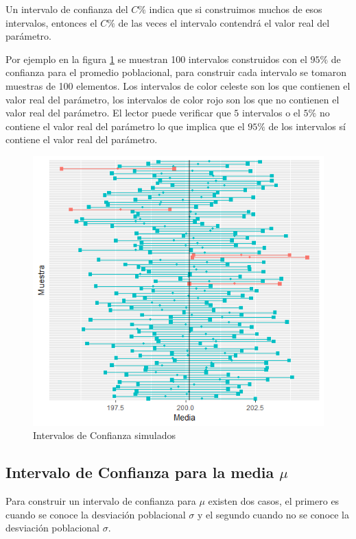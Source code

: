 \documentclass[letterpaper,]{book}
\begin{document}
Un intervalo de confianza del \(C \%\) indica que si construimos muchos de esos intervalos, entonces el \(C \%\) de las veces el intervalo contendrá el valor real del parámetro.

Por ejemplo en la figura \ref{fig:ic} se muestran 100 intervalos construidos con el \(95 \%\) de confianza para el promedio poblacional, para construir cada intervalo se tomaron muestras de 100 elementos. Los intervalos de color celeste son los que contienen el valor real del parámetro, los intervalos de color rojo son los que no contienen el valor real del parámetro. El lector puede verificar que \(5\) intervalos o el \(5 \%\) no contiene el valor real del parámetro lo que implica que el \(95 \%\) de los intervalos sí contiene el valor real del parámetro.

\begin{figure}[h!]

{\centering \includegraphics[width=0.7\linewidth]{ic} 

}

\caption{Intervalos de Confianza simulados}\label{fig:ic}
\end{figure}

\hypertarget{icmu}{%
\subsection{\texorpdfstring{Intervalo de Confianza para la media \(\mu\)}{Intervalo de Confianza para la media \textbackslash{}mu}}\label{icmu}}

Para construir un intervalo de confianza para \(\mu\) existen dos casos, el primero es cuando se conoce la desviación poblacional \(\sigma\) y el segundo cuando no se conoce la desviación poblacional \(\sigma\).
\end{document}
